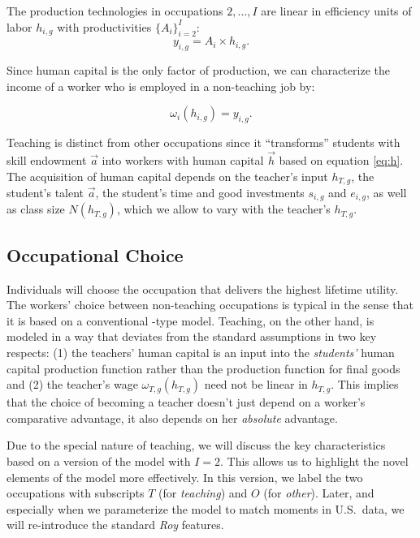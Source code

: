 \documentclass[onehalfspacing,11pt]{article}
\begin{document}
	The production technologies in occupations $2,\ldots,I$ are linear in efficiency units of labor $h_{i,g}$ with productivities $\{A_i\}_{i=2}^I$:
	\begin{equation}
		\label{ }
		y_{i,g} = A_i \times h_{i,g}.
	\end{equation}
	
	Since human capital is the only factor of production, we can characterize the income of a worker who is employed in a non-teaching job by:
	
	\begin{equation}
		\label{ }
		\omega_{i} \left( h_{i,g} \right) = y_{i,g}.
	\end{equation}
	
	Teaching is distinct from other occupations since it ``transforms'' students with skill endowment $\vec{a}$ into workers with human capital $\vec{h}$ based on equation \eqref{eq:h}. The acquisition of human capital depends on the teacher's input $h_{T,g}$, the student's talent $\vec{a}$, the student's time and good investments $s_{i,g}$ and $e_{i,g}$, as well as class size $N(h_{T,g})$, which we allow to vary with the teacher's $h_{T,g}$.
	
	\subsection{Occupational Choice}
	
	Individuals will choose the occupation that delivers the highest lifetime utility. The workers' choice between non-teaching occupations is typical in the sense that it is based on a conventional \cite{Roy:1951}-type model. Teaching, on the other hand, is modeled in a way that deviates from the standard assumptions in two key respects: (1) the teachers' human capital is an input into the {\it students'} human capital production function rather than the production function for final goods and (2) the teacher's wage $\omega_{T,g}\left( h_{T,g} \right)$ need not be linear in $h_{T,g}$. This implies that the choice of becoming a teacher doesn't just depend on a worker's comparative advantage, it also depends on her {\it absolute} advantage.
	
	Due to the special nature of teaching, we will discuss the key characteristics based on a version of the model with $I=2$. This allows us to highlight the novel elements of the model more effectively. In this version, we label the two occupations with subscripts $T$ (for {\it teaching}) and $O$ (for {\it other}). Later, and especially when we parameterize the model to match moments in U.S.~data, we will re-introduce the standard {\it Roy} features.
	
\end{document}
